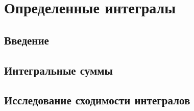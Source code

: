 \documentclass[main]{subfiles}
\begin{document}
    \section{Определенные интегралы}
    \subsection{Введение}

    \newpage
    \subsection{Интегральные суммы}

    \newpage
    \subsection{Исследование сходимости интегралов}
\end{document}
